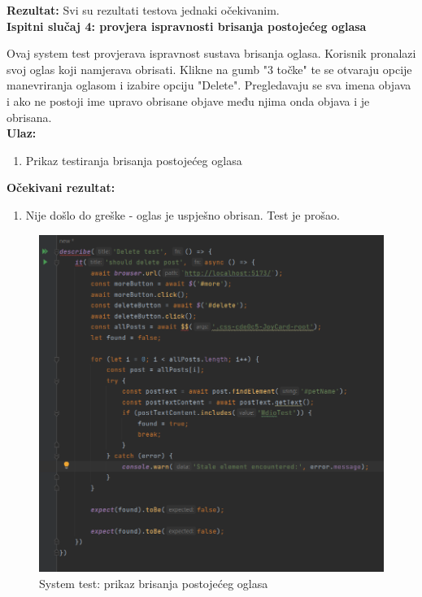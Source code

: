 			\textbf{Rezultat:}
			Svi su rezultati testova jednaki očekivanim.\\
			
			\textbf{Ispitni slučaj 4: provjera ispravnosti brisanja postojećeg oglasa}
			
			Ovaj system test provjerava ispravnost sustava brisanja oglasa. Korisnik pronalazi svoj oglas koji namjerava obrisati. Klikne na gumb "3 točke" te se otvaraju opcije manevriranja oglasom i izabire opciju "Delete". Pregledavaju se sva imena objava i ako ne postoji ime upravo obrisane objave među njima onda objava i je obrisana. \\
			
			\textbf{Ulaz:}
			
				\begin{enumerate}
					\item Prikaz testiranja brisanja postojećeg oglasa
				\end{enumerate}
				
			\textbf{Očekivani rezultat:}
			
				\begin{enumerate}
					\item Nije došlo do greške - oglas je uspješno obrisan. Test je prošao.
				\end{enumerate}
			
			\begin{figure}[H]
				\includegraphics[scale=0.7]{slike/sysdeletepost.PNG} 
				\centering
				\caption{System test: prikaz brisanja postojećeg oglasa}
				\label{sysedit1}
			\end{figure}
			

